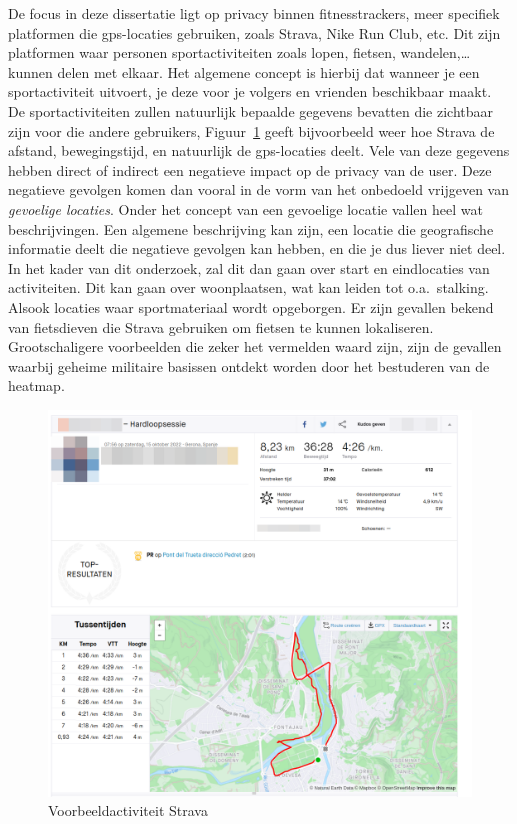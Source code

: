 De focus in deze dissertatie ligt op privacy binnen fitnesstrackers, meer
specifiek platformen die gps-locaties gebruiken, zoals Strava, Nike Run Club,
etc. Dit zijn platformen waar personen sportactiviteiten zoals lopen, fietsen,
wandelen,\ldots kunnen delen met elkaar. Het algemene concept is hierbij dat
wanneer je een sportactiviteit uitvoert, je deze voor je volgers en vrienden
beschikbaar maakt. De sportactiviteiten zullen natuurlijk bepaalde gegevens
bevatten die zichtbaar zijn voor die andere gebruikers,
Figuur~\ref{fig:activityExample} geeft bijvoorbeeld weer hoe Strava de afstand,
bewegingstijd, en natuurlijk de gps-locaties deelt. Vele van deze gegevens
hebben direct of indirect een negatieve impact op de privacy van de user. Deze
negatieve gevolgen komen dan vooral in de vorm van het onbedoeld vrijgeven van
\textit{gevoelige locaties}. Onder het concept van een gevoelige locatie vallen
heel wat beschrijvingen. Een algemene beschrijving kan zijn, een locatie die
geografische informatie deelt die negatieve gevolgen kan hebben, en die je dus
liever niet deel. In het kader van dit onderzoek, zal dit dan gaan over start
en eindlocaties van activiteiten. Dit kan gaan over woonplaatsen, wat kan
leiden tot o.a.\ stalking. Alsook locaties waar sportmateriaal wordt
opgeborgen. Er zijn gevallen bekend van fietsdieven die Strava gebruiken om
fietsen te kunnen lokaliseren\cite{Sportapp72:online}\cite{Cyclistw89:online}.
Grootschaligere voorbeelden die zeker het vermelden waard zijn, zijn de
gevallen waarbij geheime militaire basissen ontdekt worden door het bestuderen
van de heatmap\cite{Fitnesst33:online}.
\begin{figure}
    \centering
    \includegraphics[width=0.5\linewidth]{fig/VoorbeeldActiviteiten/VoorbeeldActiviteit_Cropped.png}
    \caption{Voorbeeldactiviteit Strava}\label{fig:activityExample}
\end{figure}

